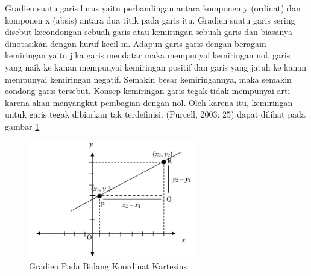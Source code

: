 \begin{enumerate}
\begin{enumerate}
Gradien suatu garis lurus yaitu perbandingan antara komponen y (ordinat) dan komponen x (absis) antara dua titik pada garis itu. Gradien suatu garis sering disebut kecondongan sebuah garis atau kemiringan sebuah garis dan biasanya dinotasikan dengan huruf kecil m. Adapun garis-garis dengan beragam kemiringan yaitu jika garis mendatar maka mempunyai kemiringan nol, garis yang naik ke kanan mempunyai kemiringan positif dan garis yang jatuh ke kanan mempunyai kemiringan negatif. Semakin besar kemiringannya, maka semakin condong garis tersebut. Konsep kemiringan garis tegak tidak mempunyai arti karena akan menyangkut pembagian dengan nol. Oleh karena  itu,  kemiringan  untuk  garis  tegak  dibiarkan  tak  terdefinisi. (Purcell, 2003: 25) dapat dilihat pada gambar \ref{gardien}
\begin{figure}[ht]
	\centerline{\includegraphics[width=0.65\textwidth]{pictures/gardien.jpg}}
	\caption{Gradien Pada Bidang Koordinat Kartesius}
	\label{gardien}
	\end{figure}
	\end{enumerate}
\end{enumerate}